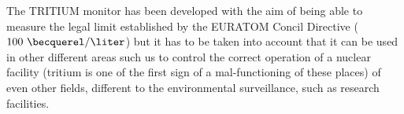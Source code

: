 The TRITIUM monitor has been developed with the aim of being able to measure the legal limit established by the EURATOM Concil Directive ($100~\becquerel/\liter$) but it has to be taken into account that it can be used in other different areas such us to control the correct operation of a nuclear facility (tritium is one of the first sign of a mal-functioning of these places) of even other fields, different to the environmental surveillance, such as research facilities.